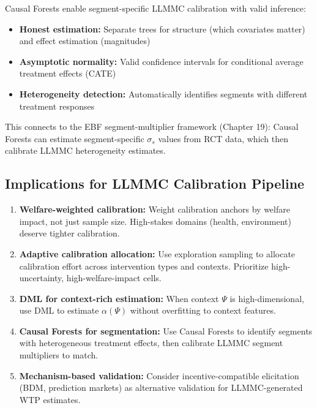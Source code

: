 Causal Forests \citep{PAP-athey2016recursive, PAP-wager2018causalforest} enable
segment-specific LLMMC calibration with valid inference:

\begin{itemize}
\item \textbf{Honest estimation:} Separate trees for structure (which covariates
matter) and effect estimation (magnitudes)

\item \textbf{Asymptotic normality:} Valid confidence intervals for conditional
average treatment effects (CATE)

\item \textbf{Heterogeneity detection:} Automatically identifies segments with
different treatment responses
\end{itemize}

This connects to the EBF segment-multiplier framework (Chapter 19): Causal Forests
can estimate segment-specific $\sigma_s$ values from RCT data, which then calibrate
LLMMC heterogeneity estimates.

\subsection{Implications for LLMMC Calibration Pipeline}

\begin{enumerate}
\item \textbf{Welfare-weighted calibration:}
Weight calibration anchors by welfare impact, not just sample size.
High-stakes domains (health, environment) deserve tighter calibration.

\item \textbf{Adaptive calibration allocation:}
Use exploration sampling to allocate calibration effort across intervention
types and contexts. Prioritize high-uncertainty, high-welfare-impact cells.

\item \textbf{DML for context-rich estimation:}
When context $\Psi$ is high-dimensional, use DML to estimate $\alpha(\Psi)$
without overfitting to context features.

\item \textbf{Causal Forests for segmentation:}
Use Causal Forests to identify segments with heterogeneous treatment effects,
then calibrate LLMMC segment multipliers to match.

\item \textbf{Mechanism-based validation:}
Consider incentive-compatible elicitation (BDM, prediction markets) as
alternative validation for LLMMC-generated WTP estimates.
\end{enumerate}

